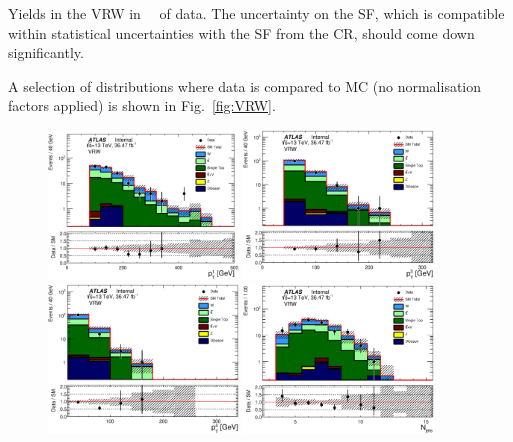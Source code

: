 \begin{table}[!htb]
  \centering
  
  \caption{Yields in the VRW in \intlumi\ \ifb\ of data. The uncertainty on the SF, which is compatible within statistical uncertainties with the SF from the CR, should come down significantly. }
  \label{tab:VRW_yields}
\end{table}

A selection of distributions where data is compared to MC (no normalisation factors applied) is shown in Fig.~\ref{fig:VRW}. 

\begin{figure}[!htb]
  \centering
  \includegraphics[width=0.45\textwidth]{figures/wJets/postfit/JetPt_1__VRW_log.eps}
  \includegraphics[width=0.45\textwidth]{figures/wJets/postfit/JetPt_3__VRW_log.eps}
  \includegraphics[width=0.45\textwidth]{figures/wJets/postfit/JetPt_4__VRW_log.eps}
  \includegraphics[width=0.45\textwidth]{figures/wJets/postfit/NJets_VRW_log.eps}

\end{figure}
